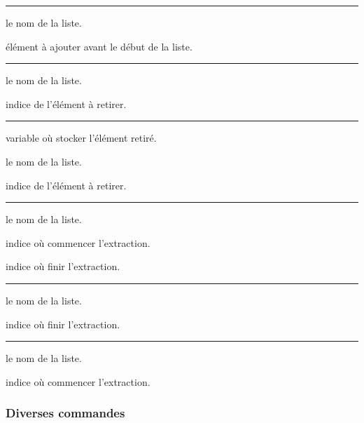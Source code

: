 \documentclass[12pt,a4paper]{article}
\theoremstyle{definition}
\newcommand\separation{
    \medskip
    \hfill\rule{0.5\textwidth}{0.75pt}\hfill
    \medskip
}
\begin{document}


\separation





 le nom de la liste.

 élément à ajouter avant le début de la liste.




\separation




 le nom de la liste.

 indice de l'élément à retirer.




\separation



 variable où stocker l'élément retiré.

 le nom de la liste.

 indice de l'élément à retirer.




\separation



 le nom de la liste.

 indice où commencer l'extraction.

 indice où finir l'extraction.




\separation



 le nom de la liste.

 indice où finir l'extraction.




\separation



 le nom de la liste.

 indice où commencer l'extraction.





\subsubsection{Diverses commandes}
\end{document}
